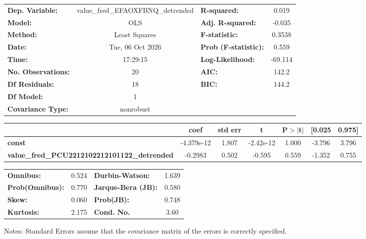 \begin{center}
\begin{tabular}{lclc}
\toprule
\textbf{Dep. Variable:}                              & value\_fred\_EFAOXFBNQ\_detrended & \textbf{  R-squared:         } &     0.019   \\
\textbf{Model:}                                      &                OLS                & \textbf{  Adj. R-squared:    } &    -0.035   \\
\textbf{Method:}                                     &           Least Squares           & \textbf{  F-statistic:       } &    0.3538   \\
\textbf{Date:}                                       &          Tue, 06 Oct 2026         & \textbf{  Prob (F-statistic):} &    0.559    \\
\textbf{Time:}                                       &              17:29:15             & \textbf{  Log-Likelihood:    } &   -69.114   \\
\textbf{No. Observations:}                           &                   20              & \textbf{  AIC:               } &     142.2   \\
\textbf{Df Residuals:}                               &                   18              & \textbf{  BIC:               } &     144.2   \\
\textbf{Df Model:}                                   &                    1              & \textbf{                     } &             \\
\textbf{Covariance Type:}                            &             nonrobust             & \textbf{                     } &             \\
\bottomrule
\end{tabular}
\begin{tabular}{lcccccc}
                                                     & \textbf{coef} & \textbf{std err} & \textbf{t} & \textbf{P$> |$t$|$} & \textbf{[0.025} & \textbf{0.975]}  \\
\midrule
\textbf{const}                                       &   -4.379e-12  &        1.807     & -2.42e-12  &         1.000        &       -3.796    &        3.796     \\
\textbf{value\_fred\_PCU2212102212101122\_detrended} &      -0.2983  &        0.502     &    -0.595  &         0.559        &       -1.352    &        0.755     \\
\bottomrule
\end{tabular}
\begin{tabular}{lclc}
\textbf{Omnibus:}       &  0.524 & \textbf{  Durbin-Watson:     } &    1.639  \\
\textbf{Prob(Omnibus):} &  0.770 & \textbf{  Jarque-Bera (JB):  } &    0.580  \\
\textbf{Skew:}          &  0.060 & \textbf{  Prob(JB):          } &    0.748  \\
\textbf{Kurtosis:}      &  2.175 & \textbf{  Cond. No.          } &     3.60  \\
\bottomrule
\end{tabular}
\end{center}

Notes: \newline
 [1] Standard Errors assume that the covariance matrix of the errors is correctly specified.
